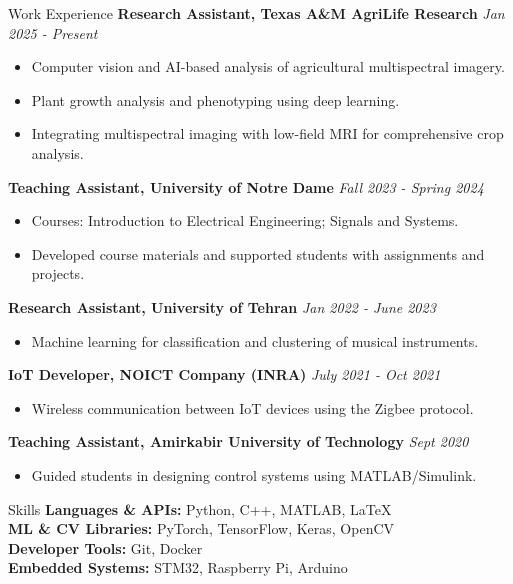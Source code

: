 \documentclass{resume} %
\begin{document}
\begin{rSection}{Work Experience}
{\bf Research Assistant, Texas A\&M AgriLife Research} \hfill {\em Jan 2025 - Present}\\
\begin{itemize}
  \item Computer vision and AI-based analysis of agricultural multispectral imagery.
  \item Plant growth analysis and phenotyping using deep learning.
  \item Integrating multispectral imaging with low-field MRI for comprehensive crop analysis.
\end{itemize}

{\bf Teaching Assistant, University of Notre Dame} \hfill {\em Fall 2023 - Spring 2024}\\
\begin{itemize}
  \item Courses: Introduction to Electrical Engineering; Signals and Systems.
  \item Developed course materials and supported students with assignments and projects.
\end{itemize}

{\bf Research Assistant, University of Tehran} \hfill {\em Jan 2022 - June 2023}\\
\begin{itemize}
  \item Machine learning for classification and clustering of musical instruments.
\end{itemize}

{\bf IoT Developer, NOICT Company (INRA)} \hfill {\em July 2021 - Oct 2021}\\
\begin{itemize}
  \item Wireless communication between IoT devices using the Zigbee protocol.
\end{itemize}

{\bf Teaching Assistant, Amirkabir University of Technology} \hfill {\em Sept 2020}\\
\begin{itemize}
  \item Guided students in designing control systems using MATLAB/Simulink.
\end{itemize}
\end{rSection}

\begin{rSection}{Skills}
{\bf Languages \& APIs:} Python, C++, MATLAB, LaTeX\\
{\bf ML \& CV Libraries:} PyTorch, TensorFlow, Keras, OpenCV\\
{\bf Developer Tools:} Git, Docker\\
{\bf Embedded Systems:} STM32, Raspberry Pi, Arduino
\end{rSection}
\end{document}
